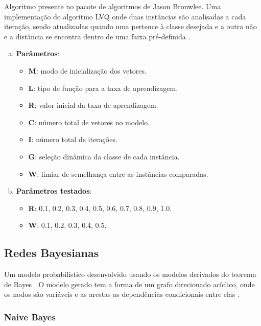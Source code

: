 Algoritmo presente no pacote de algoritmos de Jason Bronwlee. Uma implementação do algoritmo LVQ onde duas instâncias são analisadas a cada iteração, sendo atualizadas quando uma pertence à classe desejada e a outra não e a distância se encontra dentro de uma faixa pré-definida \cite{Brownlee2011w}.

\begin{enumerate}[a)]
    \item \textbf{Parâmetros}:
        \begin{itemize}
            \item \textbf{M}: modo de inicialização dos vetores.
            \item \textbf{L}: tipo de função para a taxa de aprendizagem.
            \item \textbf{R}: valor inicial da taxa de aprendizagem.
            \item \textbf{C}: número total de vetores no modelo.
            \item \textbf{I}: número total de iterações.
            \item \textbf{G}: seleção dinâmica da classe de cada instância.
            \item \textbf{W}: limiar de semelhança entre as instâncias comparadas.
        \end{itemize}
    \item \textbf{Parâmetros testados}:
        \begin{itemize}
            \item \textbf{R}: 0.1, 0.2, 0.3, 0.4, 0.5, 0.6, 0.7, 0.8, 0.9, 1.0.
            \item \textbf{W}: 0.1, 0.2, 0.3, 0.4, 0.5.
        \end{itemize}
\end{enumerate}

\subsection{Redes Bayesianas}

Um modelo probabilístico desenvolvido usando os modelos derivados do teorema de Bayes \cite{Bayes1763}. O modelo gerado tem a forma de um grafo direcionado acíclico, onde os nodos são variáveis e as arestas as dependências condicionais entre elas \cite{Pearl1988}.

\subsubsection{Naive Bayes}

